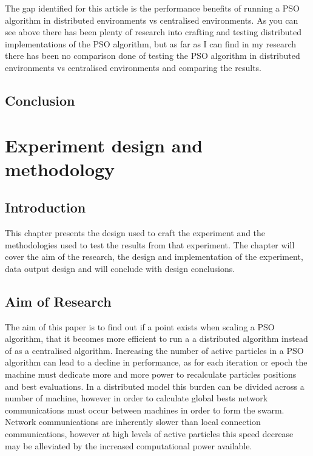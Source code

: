 \documentclass[oneside,12pt]{book}
\begin{document}
The gap identified for this article is the performance benefits of running a PSO algorithm in distributed environments vs centralised environments. As you can see above there has been plenty of research into crafting and testing distributed implementations of the PSO algorithm, but as far as I can find in my research there has been no comparison done of testing the PSO algorithm in distributed environments vs centralised environments and comparing the results.

\section{Conclusion}


\chapter{Experiment design and methodology}
\section{Introduction}
This chapter presents the design used to craft the experiment and the methodologies used to test the results from that experiment. The chapter will cover the aim of the research, the design and implementation of the experiment, data output design and will conclude with design conclusions. 
\section{Aim of Research}
The aim of this paper is to find out if a point exists when scaling a PSO algorithm, that it becomes more efficient to run a a distributed algorithm instead of as a centralised algorithm. Increasing the number of active particles in a PSO algorithm can lead to a decline in performance, as for each iteration or epoch the machine must dedicate more and more power to recalculate particles positions and best evaluations. In a distributed model this burden can be divided across a number of machine, however in order to calculate global bests network communications must occur between machines in order to form the swarm. Network communications are inherently slower than local connection communications, however at high levels of active particles this speed decrease may be alleviated by the increased computational power available. 
\end{document}
